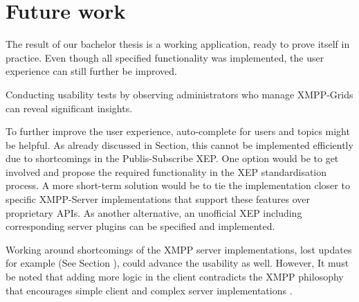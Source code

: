 




\section{Future work}
The result of our bachelor thesis is a working application, ready to prove itself in practice.
Even though all specified functionality was implemented, the user experience can still further be improved.

Conducting usability tests by observing administrators who manage XMPP-Grids can reveal significant insights\cite{krug:dont-make-me-think}.

To further improve the user experience, auto-complete for users and topics might be helpful.
As already discussed in Section, this cannot be implemented efficiently due to shortcomings in the Publis-Subscribe XEP.
One option would be to get involved and propose the required functionality in the XEP standardisation process.
A more short-term solution would be to tie the implementation closer to specific XMPP-Server implementations that support these features over proprietary APIs.
As another alternative,  an unofficial XEP including corresponding server plugins can be specified and implemented.

Working around shortcomings of the XMPP server implementations, lost updates for example (See Section ), could advance the usability as well.
However, It must be noted that adding more logic in the client contradicts the XMPP philosophy that encourages simple client and complex server implementations \cite{definitive-guide-xmpp}.

